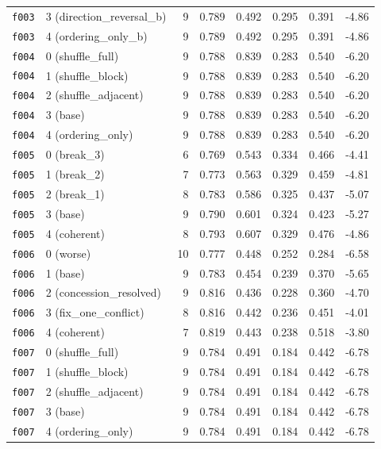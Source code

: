 \documentclass[11pt]{article}
\begin{document}
\begin{table}[htbp]
\begin{tabular}{llrrrrrr}
\texttt{f003} & 3 (direction\_reversal\_b) & 9 & 0.789 & 0.492 & 0.295 & 0.391 & -4.86 \\
\texttt{f003} & 4 (ordering\_only\_b) & 9 & 0.789 & 0.492 & 0.295 & 0.391 & -4.86 \\
\midrule
\texttt{f004} & 0 (shuffle\_full) & 9 & 0.788 & 0.839 & 0.283 & 0.540 & -6.20 \\
\texttt{f004} & 1 (shuffle\_block) & 9 & 0.788 & 0.839 & 0.283 & 0.540 & -6.20 \\
\texttt{f004} & 2 (shuffle\_adjacent) & 9 & 0.788 & 0.839 & 0.283 & 0.540 & -6.20 \\
\texttt{f004} & 3 (base) & 9 & 0.788 & 0.839 & 0.283 & 0.540 & -6.20 \\
\texttt{f004} & 4 (ordering\_only) & 9 & 0.788 & 0.839 & 0.283 & 0.540 & -6.20 \\
\midrule
\texttt{f005} & 0 (break\_3) & 6 & 0.769 & 0.543 & 0.334 & 0.466 & -4.41 \\
\texttt{f005} & 1 (break\_2) & 7 & 0.773 & 0.563 & 0.329 & 0.459 & -4.81 \\
\texttt{f005} & 2 (break\_1) & 8 & 0.783 & 0.586 & 0.325 & 0.437 & -5.07 \\
\texttt{f005} & 3 (base) & 9 & 0.790 & 0.601 & 0.324 & 0.423 & -5.27 \\
\texttt{f005} & 4 (coherent) & 8 & 0.793 & 0.607 & 0.329 & 0.476 & -4.86 \\
\midrule
\texttt{f006} & 0 (worse) & 10 & 0.777 & 0.448 & 0.252 & 0.284 & -6.58 \\
\texttt{f006} & 1 (base) & 9 & 0.783 & 0.454 & 0.239 & 0.370 & -5.65 \\
\texttt{f006} & 2 (concession\_resolved) & 9 & 0.816 & 0.436 & 0.228 & 0.360 & -4.70 \\
\texttt{f006} & 3 (fix\_one\_conflict) & 8 & 0.816 & 0.442 & 0.236 & 0.451 & -4.01 \\
\texttt{f006} & 4 (coherent) & 7 & 0.819 & 0.443 & 0.238 & 0.518 & -3.80 \\
\midrule
\texttt{f007} & 0 (shuffle\_full) & 9 & 0.784 & 0.491 & 0.184 & 0.442 & -6.78 \\
\texttt{f007} & 1 (shuffle\_block) & 9 & 0.784 & 0.491 & 0.184 & 0.442 & -6.78 \\
\texttt{f007} & 2 (shuffle\_adjacent) & 9 & 0.784 & 0.491 & 0.184 & 0.442 & -6.78 \\
\texttt{f007} & 3 (base) & 9 & 0.784 & 0.491 & 0.184 & 0.442 & -6.78 \\
\texttt{f007} & 4 (ordering\_only) & 9 & 0.784 & 0.491 & 0.184 & 0.442 & -6.78 \\

\end{tabular}
\end{table}
\end{document}
